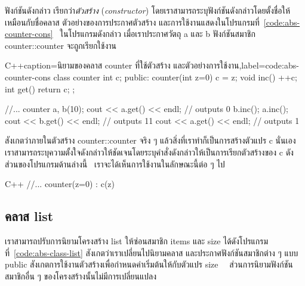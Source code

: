 ฟังก์ชัน{\wbr}ดังกล่าว เรียก{\wbr}ว่า{\em ตัว{\wbr}สร้าง} ({\em constructor})
โดย{\wbr}เรา{\wbr}สามารถ{\wbr}ระบุ{\wbr}ฟังก์ชัน{\wbr}ดังกล่าว{\wbr}โดย{\wbr}ตั้ง{\wbr}ชื่อ{\wbr}ให้{\wbr}เหมือน{\wbr}กับ{\wbr}ชื่อ{\wbr}ค{\wbr}ลา{\wbr}ส
ตัวอย่าง{\wbr}ของ{\wbr}การ{\wbr}ประกาศ{\wbr}ตัว{\wbr}สร้าง{\wbr}
และ{\wbr}การ{\wbr}ใช้{\wbr}งาน{\wbr}แสดง{\wbr}ใน{\wbr}โปรแกรม{\wbr}ที่~\ref{code:abs-counter-cons} \ ใน{\wbr}โปรแกรม{\wbr}ดังกล่าว{\wbr}
เมื่อ{\wbr}เรา{\wbr}ประกาศ{\wbr}วัตถุ {\ct a} และ {\ct b} ฟังก์ชัน{\wbr}สมาชิก {\ct counter::counter}
จะ{\wbr}ถูก{\wbr}เรียก{\wbr}ใช้{\wbr}งาน{\wbr}

\latintext
\begin{codelist}{C++}{caption={\thaitext นิยาม{\wbr}ของ{\wbr}ค{\wbr}ลา{\wbr}ส {\ct counter} ที่{\wbr}ใช้{\wbr}ตัว{\wbr}สร้าง และ{\wbr}ตัวอย่าง{\wbr}การ{\wbr}ใช้{\wbr}งาน\latintext},label=code:abs-counter-cons}
class counter {
  int c;
public:
  counter(int z=0) { c = z; }
  void inc() { ++c; }
  int get() { return c; }
};

  //...
  counter a, b(10);
  cout << a.get() << endl;    // outputs 0
  b.inc(); a.inc();
  cout << b.get() << endl;    // outputs 11
  cout << a.get() << endl;    // outputs 1
\end{codelist}
\thaitext

สังเกต{\wbr}ว่า{\wbr}ภายใน{\wbr}ตัว{\wbr}สร้าง {\ct counter::counter} จริง ๆ
แล้ว{\wbr}สิ่ง{\wbr}ที่{\wbr}เรา{\wbr}ทำ{\wbr}ก็{\wbr}เป็น{\wbr}การ{\wbr}สร้าง{\wbr}ตัวแปร {\ct c} นั่นเอง{\wbr}
เรา{\wbr}สามารถ{\wbr}ระบุ{\wbr}ความ{\wbr}ตั้งใจ{\wbr}ดังกล่าว{\wbr}ให้{\wbr}ชัดเจน{\wbr}โดย{\wbr}ระบุ{\wbr}คำสั่ง{\wbr}ดังกล่าว{\wbr}ให้{\wbr}เป็น{\wbr}การ{\wbr}เรียก{\wbr}ตัว{\wbr}สร้าง{\wbr}ของ{\wbr}
{\ct c} ดัง{\wbr}ส่วน{\wbr}ของ{\wbr}โปรแกรม{\wbr}ด้าน{\wbr}ล่าง{\wbr}นี้ \ เรา{\wbr}จะ{\wbr}ได้{\wbr}เห็น{\wbr}การ{\wbr}ใช้{\wbr}งาน{\wbr}ใน{\wbr}ลักษณะ{\wbr}นี้{\wbr}ต่อ ๆ ไป{\wbr}

\latintext
\begin{codelist}{C++}{}
  //...
  counter(z=0) : c(z) {}
\end{codelist}
\thaitext

\subsection{ค{\wbr}ลา{\wbr}ส {\ct list}}

เรา{\wbr}สามารถ{\wbr}ปรับ{\wbr}การ{\wbr}นิยาม{\wbr}โครงสร้าง {\ct list} ให้{\wbr}ซ่อน{\wbr}สมาชิก {\ct items} และ {\ct
  size} ได้{\wbr}ดัง{\wbr}โปรแกรม{\wbr}ที่~\ref{code:abs-class-list}
สังเกต{\wbr}ว่า{\wbr}เรา{\wbr}เปลี่ยน{\wbr}ไป{\wbr}นิยาม{\wbr}ค{\wbr}ลา{\wbr}ส และ{\wbr}ประกาศ{\wbr}ฟังก์ชัน{\wbr}สมาชิก{\wbr}ต่าง ๆ แบบ {\ct public}
สังเกต{\wbr}การ{\wbr}ใช้{\wbr}งาน{\wbr}ตัว{\wbr}สร้าง{\wbr}เพื่อ{\wbr}กำหนด{\wbr}ค่า{\wbr}เริ่มต้น{\wbr}ให้{\wbr}กับ{\wbr}ตัวแปร {\ct size}
\ \ ส่วน{\wbr}การ{\wbr}นิยาม{\wbr}ฟังก์ชัน{\wbr}สมาชิก{\wbr}อื่น ๆ ของ{\wbr}โครงสร้าง{\wbr}นั้น{\wbr}ไม่{\wbr}มี{\wbr}การ{\wbr}เปลี่ยนแปลง{\wbr}

